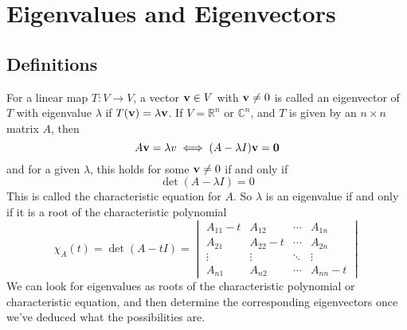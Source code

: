 \documentclass{article}
\begin{document}
\section{Eigenvalues and Eigenvectors}
\subsection{Definitions}
For a linear map $T\colon V \to V$, a vector $\vb v \in V$ with $\vb v \neq 0$ is called an eigenvector of $T$ with eigenvalue $\lambda$ if $T(\vb v) = \lambda \vb v$. If $V = \mathbb R^n$ or $\mathbb C^n$, and $T$ is given by an $n \times n$ matrix $A$, then
\[ A\vb v = \lambda v \iff (A - \lambda I)\vb v = \vb 0 \]
and for a given $\lambda$, this holds for some $\vb v \neq 0$ if and only if
\[ \det(A - \lambda I) = 0 \]
This is called the characteristic equation for $A$. So $\lambda$ is an eigenvalue if and only if it is a root of the characteristic polynomial
\[ \chi_A(t) = \det(A - tI) = \begin{vmatrix}
		A_{11} - t & A_{12}     & \cdots & A_{1n}     \\
		A_{21}     & A_{22} - t & \cdots & A_{2n}     \\
		\vdots     & \vdots     & \ddots & \vdots     \\
		A_{n1}     & A_{n2}     & \cdots & A_{nn} - t
	\end{vmatrix} \]
We can look for eigenvalues as roots of the characteristic polynomial or characteristic equation, and then determine the corresponding eigenvectors once we've deduced what the possibilities are.
\end{document}
